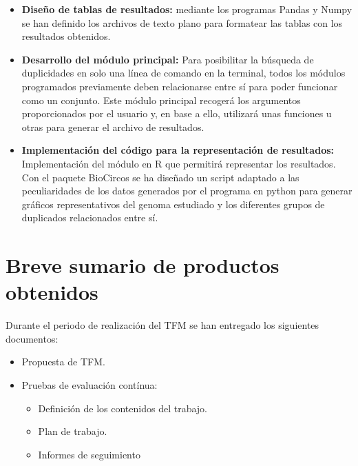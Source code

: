 \begin{itemize}
    \item \textbf{Diseño de tablas de resultados: }mediante los programas Pandas y Numpy se han definido los archivos de texto plano para formatear las tablas con los resultados obtenidos.
    
    \item \textbf{Desarrollo del módulo principal: }Para posibilitar la búsqueda de duplicidades en solo una línea de comando en la terminal, todos los módulos programados previamente deben relacionarse entre sí para poder funcionar como un conjunto. Este módulo principal recogerá los argumentos proporcionados por el usuario y, en base a ello, utilizará unas funciones u otras para generar el archivo de resultados.
    
    \item \textbf{Implementación del código para la representación de resultados: }Implementación del módulo en R que permitirá representar los resultados. Con el paquete BioCircos se ha diseñado un script adaptado a las peculiaridades de los datos generados por el programa en python para generar gráficos representativos del genoma estudiado y los diferentes grupos de duplicados relacionados entre sí.
\end{itemize}












\section{Breve sumario de productos obtenidos}

Durante el periodo de realización del TFM se han entregado los siguientes documentos:

\begin{itemize}
    \item Propuesta de TFM.
    \item Pruebas de evaluación contínua:
    \begin{itemize}
        \item Definición de los contenidos del trabajo.
        \item Plan de trabajo.
        \item Informes de seguimiento
    \end{itemize}
\end{itemize}

